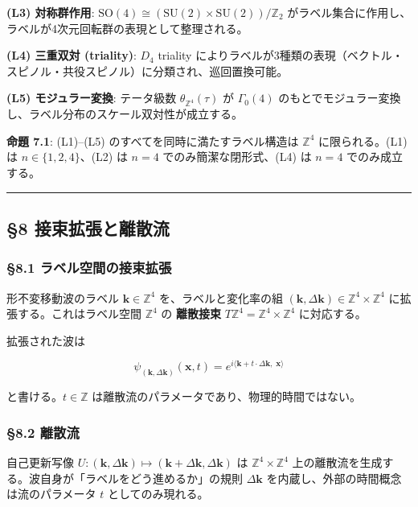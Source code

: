 \documentclass[
  a4paper,11pt]{ltjsarticle}
\theoremstyle{definition}
\theoremstyle{remark}
\begin{document}
\textbf{(L3) 対称群作用}:
\(\mathrm{SO}(4) \cong (\mathrm{SU}(2) \times \mathrm{SU}(2))/\mathbb{Z}_2\)
がラベル集合に作用し、ラベルが4次元回転群の表現として整理される。

\textbf{(L4) 三重双対 (triality)}: \(D_4\) triality
によりラベルが3種類の表現（ベクトル・スピノル・共役スピノル）に分類され、巡回置換可能。

\textbf{(L5) モジュラー変換}: テータ級数 \(\theta_{\mathbb{Z}^4}(\tau)\)
が \(\Gamma_0(4)\)
のもとでモジュラー変換し、ラベル分布のスケール双対性が成立する。

\textbf{命題 7.1}: (L1)--(L5) のすべてを同時に満たすラベル構造は
\(\mathbb{Z}^4\) に限られる。(L1) は \(n \in \{1, 2, 4\}\)、(L2) は
\(n = 4\) でのみ簡潔な閉形式、(L4) は \(n = 4\) でのみ成立する。

\begin{center}\rule{0.5\linewidth}{0.5pt}\end{center}

\subsection{§8
接束拡張と離散流}\label{ux63a5ux675fux62e1ux5f35ux3068ux96e2ux6563ux6d41}

\subsubsection{§8.1
ラベル空間の接束拡張}\label{ux30e9ux30d9ux30ebux7a7aux9593ux306eux63a5ux675fux62e1ux5f35}

形不変移動波のラベル \(\mathbf{k} \in \mathbb{Z}^4\)
を、ラベルと変化率の組
\((\mathbf{k}, \Delta\mathbf{k}) \in \mathbb{Z}^4 \times \mathbb{Z}^4\)
に拡張する。これはラベル空間 \(\mathbb{Z}^4\) の \textbf{離散接束}
\(T\mathbb{Z}^4 = \mathbb{Z}^4 \times \mathbb{Z}^4\) に対応する。

拡張された波は

\[\psi_{(\mathbf{k}, \Delta\mathbf{k})}(\mathbf{x}, t) = e^{i\langle \mathbf{k} + t \cdot \Delta\mathbf{k},\; \mathbf{x} \rangle}\]

と書ける。\(t \in \mathbb{Z}\)
は離散流のパラメータであり、物理的時間ではない。

\subsubsection{§8.2 離散流}\label{ux96e2ux6563ux6d41}

自己更新写像
\(U : (\mathbf{k}, \Delta\mathbf{k}) \mapsto (\mathbf{k} + \Delta\mathbf{k}, \Delta\mathbf{k})\)
は \(\mathbb{Z}^4 \times \mathbb{Z}^4\)
上の離散流を生成する。波自身が「ラベルをどう進めるか」の規則
\(\Delta\mathbf{k}\) を内蔵し、外部の時間概念は流のパラメータ \(t\)
としてのみ現れる。
\end{document}
